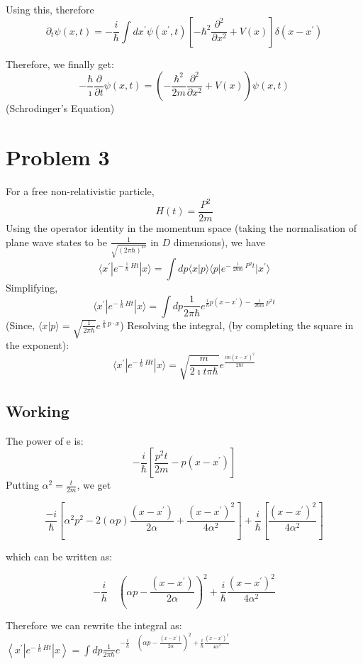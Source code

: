 \documentclass{article}
\begin{document}
Using this, therefore
$$\partial_{t}\psi(x,t)=-\frac{i}{\hbar}\int dx^{\prime}  \psi (x^{\prime},t)  [-\hbar^2\frac{\partial^2}{\partial x^2} + V(x) ] \delta(x-x^{\prime})$$

Therefore, we finally get:
$$ -\frac{\hbar}{\imath}\frac{\partial}{\partial t}\psi(x,t) = (-\frac{\hbar^2}{2m}\frac{\partial^2}{\partial x^2} + V(x))\psi(x,t)$$
(Schrodinger's Equation)
\section*{Problem 3}
For a free non-relativistic particle, $$H(t) = \frac{P^2}{2m}$$
Using the operator identity in the momentum space (taking the normalisation of plane wave states to be $\frac{1}{\sqrt{(2 \pi \hbar)^{D}}}$ in $D$ dimensions), we have
$$ \langle x^{\prime} | e^{-\frac{\imath}{\hbar} Ht} | x \rangle = \int dp \langle x |p \rangle  \langle p | e^{-\frac{\imath}{2\hbar m}P^2t} | x^{\prime} \rangle $$
Simplifying,
$$ \langle x^{\prime} | e^{-\frac{\imath}{\hbar}Ht} | x \rangle = \int dp \frac{1}{2\pi\hbar} e^{\frac{i}{\hbar}p\left(x-x^{\prime}\right)-\frac{\imath}{2\hbar m}p^2t}$$
(Since, $\langle x | p \rangle = \sqrt{\frac{1}{2\pi \hbar}}e^{\frac{\imath}{\hbar} p\cdot x}$) \newline
Resolving the integral, (by completing the square in the exponent):
$$ \langle x^{\prime} | e^{-\frac{\imath}{\hbar}Ht} | x \rangle =\sqrt{\frac{m}{2 \imath t \pi \hbar}} e^{\frac{i m (x-x^{\prime})^2}{2 \hbar t}}$$
\subsection*{Working}
The power of e is:
$$
-\frac{i}{\hbar}\left[\frac{p^{2} t}{2 m}-p\left(x-x^{\prime}\right)\right]
$$
Putting \( \alpha^{2}=\frac{t}{2 m} \), we get

$$
\frac{-i}{\hbar}\left[\alpha^{2} p^{2}-2(\alpha p) \frac{\left(x-x^{\prime}\right)}{2 \alpha}+\frac{\left(x-x^{\prime}\right)^{2}}{4 \alpha^{2}}\right]+\frac{i}{\hbar}\left[\frac{(x-x^{\prime})^2}{4 \alpha^{2}}\right]
$$

which can be written as:

$$
-\frac{i}{h} \quad\left(\alpha p-\frac{\left(x-x^{\prime}\right)}{2 \alpha}\right)^{2}+\frac{i}{\hbar} \frac{\left(x-x^{\prime}\right)^{2}}{4 \alpha^{2}}
$$

Therefore we can rewrite the integral as:
\( \left\langle x^{\prime}\left|e^{-\frac{\imath}{\hbar} H t}\right| x\right\rangle=\int d p \frac{1}{2 \pi \hbar}e^{-\frac{i}{h} \quad\left(\alpha p-\frac{\left(x-x^{\prime}\right)}{2 \alpha}\right)^{2}+\frac{i}{\hbar} \frac{\left(x-x^{\prime}\right)^{2}}{4 \alpha^{2}}} \)
\end{document}
